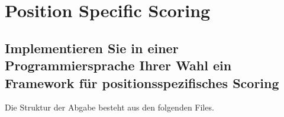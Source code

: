 \section{Position Specific Scoring}
\subsection*{Implementieren Sie in einer Programmiersprache Ihrer Wahl ein Framework für positionsspezifisches Scoring}


\bigskip\noindent
Die Struktur der Abgabe besteht aus den folgenden Files.
\newline
{}



